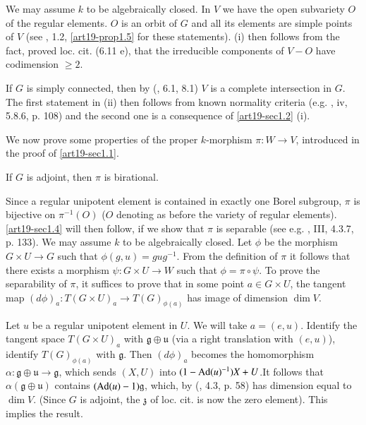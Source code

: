 We may assume $k$ to be algebraically closed. In $V$ we have the open subvariety $O$ of the regular elements. $O$ is an orbit of $G$ and all its elements are simple points of $V$ (see \cite{art19-key15}, 1.2, \ref{art19-prop1.5} for these statements). (i) then follows from the fact, proved loc. cit. (6.11 e), that the irreducible components of $V-O$ have codimension $\geq 2$.

If $G$ is simply connected, then by (\cite{art19-key15}, 6.1, 8.1) $V$ is a complete intersection in $G$. The first statement in (ii) then follows from known normality criteria (e.g. \cite{art19-key7}, iv, 5.8.6, p. 108) and the second one is a consequence of \ref{art19-sec1.2} (i).

We now prove some properties of the proper $k$-morphism $\pi:W\to V$, introduced in the proof of \ref{art19-sec1.1}.

\begin{proposition}\label{art19-prop1.4}
If $G$ is adjoint, then $\pi$ is birational.
\end{proposition}

Since a regular unipotent element is contained in exactly one Borel subgroup, $\pi$ is bijective on $\pi^{-1}(O)$ ($O$ denoting as before the variety of regular elements). \ref{art19-sec1.4} will then follow, if we show that $\pi$ is separable (see e.g. \cite{art19-key17}, III, 4.3.7, p. 133). We may assume $k$ to be algebraically closed. Let $\phi$ be the morphism $G\times U\to G$ such that $\phi(g,u)=gug^{-1}$. From the definition of $\pi$ it follows that there exists a morphism $\psi : G\times U\to W$ such that $\phi=\pi\circ\psi$. To prove the separability of $\pi$, it suffices to prove that in some point $a\in G\times U$, the tangent map $(d\phi)_{a}:T(G\times U)_{a}\to T(G)_{\phi(a)}$ has image of dimension $\dim V$.

Let $u$ be a regular unipotent element in $U$. We will take $a=(e,u)$. Identify the tangent space $T(G\times U)_{a}$ with $\mathfrak{g}\oplus \mathfrak{u}$ (via a right translation with $(e,u)$), identify $T(G)_{\phi(a)}$ with $\mathfrak{g}$. Then $(d\phi)_{a}$ becomes the homomorphism $\alpha :\mathfrak{g}\oplus \mathfrak{u}\to \mathfrak{g}$, which sends $(X,U)$ into $(1-\operatorname{\mathrm{Ad}}(u)^{-1})X+U$.\pageoriginale It follows that $\alpha(\mathfrak{g}\oplus \mathfrak{u})$ contains $(\operatorname{\mathrm{Ad}} (u)-1)\mathfrak{g}$, which, by (\cite{art19-key15}, 4.3, p. 58) has dimension equal to $\dim V$. (Since $G$ is adjoint, the $\mathfrak{z}$ of loc. cit. is now the zero element). This implies the result.

